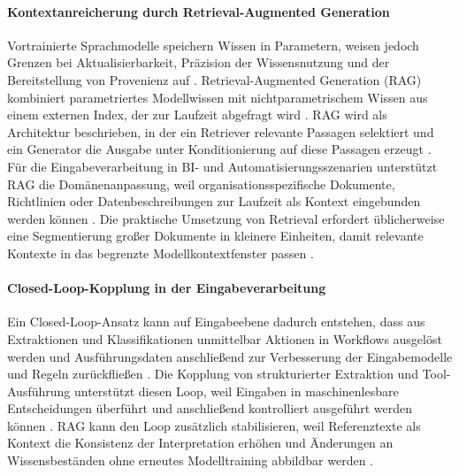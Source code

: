 \paragraph{Kontextanreicherung durch Retrieval-Augmented Generation}
Vortrainierte Sprachmodelle speichern Wissen in Parametern, weisen jedoch Grenzen bei Aktualisierbarkeit, Präzision der Wissensnutzung und der Bereitstellung von Provenienz auf \cite{Lewis2020RAG}. 
Retrieval-Augmented Generation (RAG) kombiniert parametriertes Modellwissen mit nichtparametrischem Wissen aus einem externen Index, der zur Laufzeit abgefragt wird \cite{Lewis2020RAG}. 
RAG wird als Architektur beschrieben, in der ein Retriever relevante Passagen selektiert und ein Generator die Ausgabe unter Konditionierung auf diese Passagen erzeugt \cite{Lewis2020RAG}. 
Für die Eingabeverarbeitung in BI- und Automatisierungsszenarien unterstützt RAG die Domänenanpassung, weil organisationsspezifische Dokumente, Richtlinien oder Datenbeschreibungen zur Laufzeit als Kontext eingebunden werden können \cite{Lewis2020RAG,LangChainRetrieval}. 
Die praktische Umsetzung von Retrieval erfordert üblicherweise eine Segmentierung großer Dokumente in kleinere Einheiten, damit relevante Kontexte in das begrenzte Modellkontextfenster passen \cite{LangChainSplitters}. 

\paragraph{Closed-Loop-Kopplung in der Eingabeverarbeitung}
Ein Closed-Loop-Ansatz kann auf Eingabeebene dadurch entstehen, dass aus Extraktionen und Klassifikationen unmittelbar Aktionen in Workflows ausgelöst werden und Ausführungsdaten anschließend zur Verbesserung der Eingabemodelle und Regeln zurückfließen \cite{OpenAIFunctionCalling,Lewis2020RAG}. 
Die Kopplung von strukturierter Extraktion und Tool-Ausführung unterstützt diesen Loop, weil Eingaben in maschinenlesbare Entscheidungen überführt und anschließend kontrolliert ausgeführt werden können \cite{OpenAIStructuredOutputs,OpenAIFunctionCalling}. 
RAG kann den Loop zusätzlich stabilisieren, weil Referenztexte als Kontext die Konsistenz der Interpretation erhöhen und Änderungen an Wissensbeständen ohne erneutes Modelltraining abbildbar werden \cite{Lewis2020RAG,LangChainRetrieval}. 

